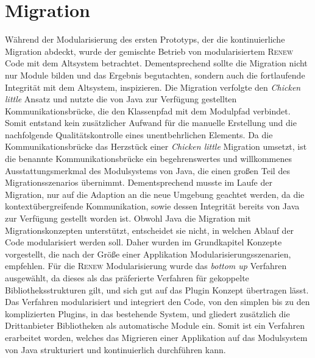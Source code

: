 \section{Migration}
Während der Modularisierung des ersten Prototyps, der die kontinuierliche Migration abdeckt, wurde der gemischte Betrieb von modularisiertem \textsc{Renew} Code mit dem Altsystem betrachtet. Dementsprechend sollte die Migration nicht nur Module bilden und das Ergebnis begutachten, sondern auch die fortlaufende Integrität mit dem Altsystem, inspizieren.\newline
Die Migration verfolgte den \textit{Chicken little} Ansatz und nutzte die von Java zur Verfügung gestellten Kommunikationsbrücke, die den Klassenpfad mit dem Modulpfad verbindet. Somit entstand kein zusätzlicher Aufwand für die manuelle Erstellung und die nachfolgende Qualitätskontrolle eines unentbehrlichen Elements. Da die Kommunikationsbrücke das Herzstück einer \textit{Chicken little} Migration umsetzt, ist die benannte Kommunikationsbrücke ein begehrenswertes und willkommenes Ausstattungsmerkmal des Modulsystems von Java, die einen großen Teil des Migrationsszenarios übernimmt. Dementsprechend musste im Laufe der Migration, nur auf die Adaption an die neue Umgebung geachtet werden, da die kontextübergreifende Kommunikation, sowie dessen Integrität bereits von Java zur Verfügung gestellt worden ist. \newline
Obwohl Java die Migration mit Migrationskonzepten unterstützt, entscheidet sie nicht, in welchen Ablauf der Code modularisiert werden soll. Daher wurden im Grundkapitel Konzepte vorgestellt, die nach der Größe einer Applikation Modularisierungsszenarien, empfehlen. Für die \textsc{Renew} Modularisierung wurde das \textit{bottom up} Verfahren ausgewählt, da dieses als das präferierte Verfahren für gekoppelte Bibliotheksstrukturen gilt, und sich gut auf das Plugin Konzept übertragen lässt. Das Verfahren modularisiert und integriert den Code, von den simplen bis zu den komplizierten Plugins, in das bestehende System, und gliedert zusätzlich die Drittanbieter Bibliotheken als automatische Module ein.\newline
Somit ist ein Verfahren erarbeitet worden, welches das Migrieren einer Applikation auf das Modulsystem von Java strukturiert und kontinuierlich durchführen kann.

